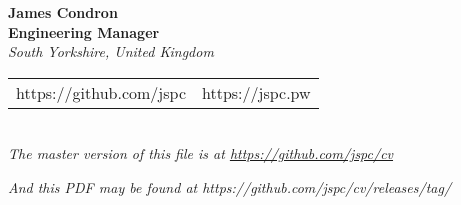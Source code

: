 \begin{center}
  {\huge\textbf{James Condron}}\\
  \textbf{Engineering Manager} \\[\baselineskip]
  \textit{South Yorkshire, United Kingdom} \\

  \begin{tabular}{rl}
    https://github.com/jspc & https://jspc.pw \\
  \end{tabular} \\[\baselineskip]

  {\footnotesize\textit{The master version of this file is at \url{https://github.com/jspc/cv}}}

  {\footnotesize\textit{And this PDF may be found at https://github.com/jspc/cv/releases/tag/}}%
  {}

\end{center}
